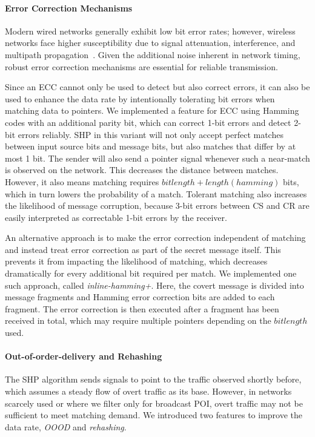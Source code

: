 \documentclass[journal]{IEEEtran}
\begin{document}
\paragraph{Error Correction Mechanisms}
\label{sec:ecc}
Modern wired networks generally exhibit low bit error rates; however, wireless networks face higher susceptibility due to signal attenuation, interference, and multipath propagation~\cite{jacobs2015}. Given the additional noise inherent in network timing, robust error correction mechanisms are essential for reliable transmission. 

Since an \ac{ECC} cannot only be used to detect but also correct errors, it can also be used to enhance the data rate by intentionally tolerating bit errors when matching data to pointers. We implemented a feature for \ac{ECC} using Hamming codes with an additional parity bit, which can correct 1-bit errors and detect 2-bit errors reliably. SHP in this variant will not only accept perfect matches between input source bits and message bits, but also matches that differ by at most 1 bit. The sender will also send a pointer signal whenever such a near-match is observed on the network. This decreases the distance between matches. However, it also means matching requires $bitlength+length(hamming)$ bits, which in turn lowers the probability of a match. Tolerant matching also increases the likelihood of message corruption, because 3-bit errors between \ac{CS} and \ac{CR} are easily interpreted as correctable 1-bit errors by the receiver. 

An alternative approach is to make the error correction independent of matching and instead treat error correction as part of the secret message itself. This prevents it from impacting the likelihood of matching, which decreases dramatically for every additional bit required per match. We implemented one such approach, called \emph{inline-hamming+}. Here, the covert message is divided into message fragments and Hamming error correction bits are added to each fragment. The error correction is then executed after a fragment has been received in total, which may require multiple pointers depending on the $bitlength$ used. 

\paragraph{Out-of-order-delivery and Rehashing}
The \ac{SHP} algorithm sends signals to point to the traffic observed shortly before, which assumes a steady flow of overt traffic as its base. However, in networks scarcely used or where we filter only for broadcast \ac{POI}, overt traffic may not be sufficient to meet matching demand. We introduced two features to improve the data rate, \textit{\ac{OOOD}} and \textit{rehashing}.
\end{document}
